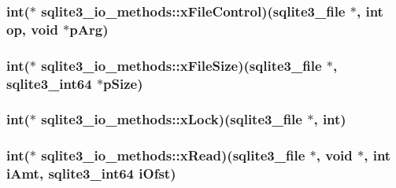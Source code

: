 \hypertarget{structsqlite3__io__methods_a5d2a5ba7937b4a6c6c5ba62c4e2b9166}{
\subsubsection[{x\-File\-Control}]{\setlength{\rightskip}{0pt plus 5cm}int($\ast$ sqlite3\-\_\-io\-\_\-methods\-::x\-File\-Control)({\bf sqlite3\-\_\-file} $\ast$, int op, void $\ast$p\-Arg)}}\label{structsqlite3__io__methods_a5d2a5ba7937b4a6c6c5ba62c4e2b9166}
\hypertarget{structsqlite3__io__methods_ad269e3cbda39d0a2383aef13b60b02f8}{
\subsubsection[{x\-File\-Size}]{\setlength{\rightskip}{0pt plus 5cm}int($\ast$ sqlite3\-\_\-io\-\_\-methods\-::x\-File\-Size)({\bf sqlite3\-\_\-file} $\ast$, {\bf sqlite3\-\_\-int64} $\ast$p\-Size)}}\label{structsqlite3__io__methods_ad269e3cbda39d0a2383aef13b60b02f8}
\hypertarget{structsqlite3__io__methods_a3e4749687788b89ed0f672db7a4f6ac8}{
\subsubsection[{x\-Lock}]{\setlength{\rightskip}{0pt plus 5cm}int($\ast$ sqlite3\-\_\-io\-\_\-methods\-::x\-Lock)({\bf sqlite3\-\_\-file} $\ast$, int)}}\label{structsqlite3__io__methods_a3e4749687788b89ed0f672db7a4f6ac8}
\hypertarget{structsqlite3__io__methods_a19870694752f65e8738d89d871d0ca7f}{
\subsubsection[{x\-Read}]{\setlength{\rightskip}{0pt plus 5cm}int($\ast$ sqlite3\-\_\-io\-\_\-methods\-::x\-Read)({\bf sqlite3\-\_\-file} $\ast$, void $\ast$, int i\-Amt, {\bf sqlite3\-\_\-int64} i\-Ofst)}}\label{structsqlite3__io__methods_a19870694752f65e8738d89d871d0ca7f}
